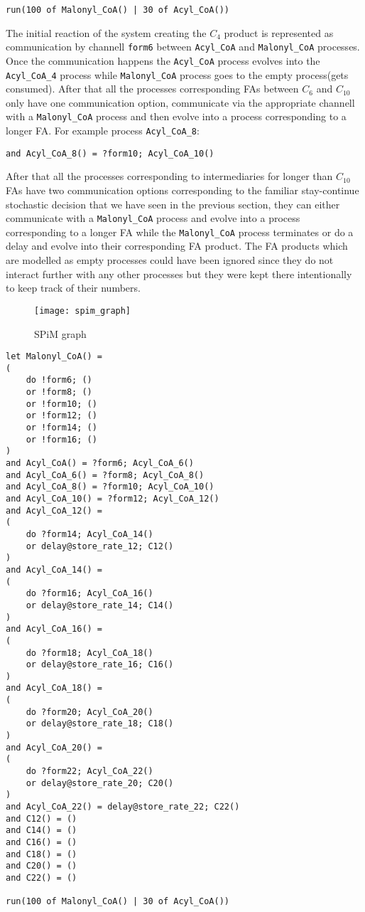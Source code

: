 \begin{verbatim}
run(100 of Malonyl_CoA() | 30 of Acyl_CoA())
\end{verbatim}

The initial reaction of the system creating the $C_4$ product is represented as
communication by channell \texttt{form6} between \texttt{Acyl\_CoA} and
\texttt{Malonyl\_CoA} processes. Once the communication happens the
\texttt{Acyl\_CoA} process evolves into the  \texttt{Acyl\_CoA\_4}
process while \texttt{Malonyl\_CoA} process goes to the empty
process(gets consumed). After that all the processes corresponding
FAs between $C_6$ and $C_{10}$ only have one communication option,
communicate via the appropriate channell with a \texttt{Malonyl\_CoA}
process and then evolve into a process corresponding to a longer
FA. For example process \texttt{Acyl\_CoA\_8}:

\begin{verbatim}
and Acyl_CoA_8() = ?form10; Acyl_CoA_10()
\end{verbatim}

After that all the processes corresponding to intermediaries for longer
than $C_{10}$ FAs have two communication options corresponding to the familiar
stay-continue stochastic decision that we have seen in the previous section, they
can either communicate with a \texttt{Malonyl\_CoA} process and evolve
into a process corresponding to a longer FA while the
\texttt{Malonyl\_CoA} process terminates or do a delay and evolve into
their corresponding FA product. The FA products which are modelled as
empty processes could have been ignored since they do not interact
further with any other processes but they were kept there
intentionally to keep track of their numbers.

\begin{figure}[htbp!]
\centering
\texttt{[image: spim\_graph]}
\caption[SPiM graph]{SPiM graph}
\label{fig:spim_graph}
\end{figure}

\begin{verbatim}
let Malonyl_CoA() =
(
	do !form6; ()
	or !form8; ()
	or !form10; ()
	or !form12; ()
	or !form14; ()
	or !form16; ()
)
and Acyl_CoA() = ?form6; Acyl_CoA_6()
and Acyl_CoA_6() = ?form8; Acyl_CoA_8()
and Acyl_CoA_8() = ?form10; Acyl_CoA_10()
and Acyl_CoA_10() = ?form12; Acyl_CoA_12()
and Acyl_CoA_12() =
(
	do ?form14; Acyl_CoA_14()
	or delay@store_rate_12; C12()
)
and Acyl_CoA_14() =
(
	do ?form16; Acyl_CoA_16()
	or delay@store_rate_14; C14()
)
and Acyl_CoA_16() =
(
	do ?form18; Acyl_CoA_18()
	or delay@store_rate_16; C16()
)
and Acyl_CoA_18() =
(
	do ?form20; Acyl_CoA_20()
	or delay@store_rate_18; C18()
)
and Acyl_CoA_20() =
(
	do ?form22; Acyl_CoA_22()
	or delay@store_rate_20; C20()
)
and Acyl_CoA_22() = delay@store_rate_22; C22()
and C12() = ()
and C14() = ()
and C16() = ()
and C18() = ()
and C20() = ()
and C22() = ()

run(100 of Malonyl_CoA() | 30 of Acyl_CoA())
\end{verbatim}


